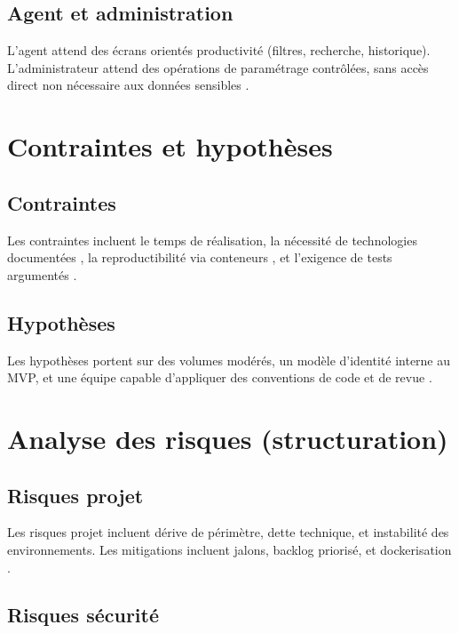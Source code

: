 \subsection{Agent et administration}

L'agent attend des écrans orientés productivité (filtres, recherche, historique). L'administrateur attend des opérations de paramétrage contrôlées, sans accès direct non nécessaire aux données sensibles \cite{iso25010}.

\section{Contraintes et hypothèses}

\subsection{Contraintes}

Les contraintes incluent le temps de réalisation, la nécessité de technologies documentées \cite{laraveldoc,postgresdoc}, la reproductibilité via conteneurs \cite{dockerdoc}, et l'exigence de tests argumentés \cite{ieee1012}.

\subsection{Hypothèses}

Les hypothèses portent sur des volumes modérés, un modèle d'identité interne au MVP, et une équipe capable d'appliquer des conventions de code et de revue \cite{gamma1994,fowler2002}.

\section{Analyse des risques (structuration)}

\subsection{Risques projet}

Les risques projet incluent dérive de périmètre, dette technique, et instabilité des environnements. Les mitigations incluent jalons, backlog priorisé, et dockerisation \cite{twelvefactor,dockerdoc}.

\subsection{Risques sécurité}


